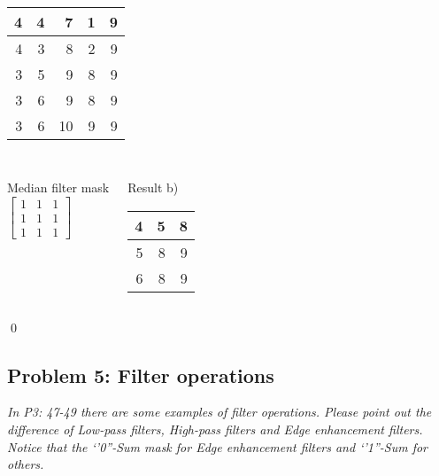 \documentclass[
        ]{beamer}
\begin{document}
\begin{frame}[c]{\subsecname }
\begin{overprint}
\begin{center}
\begin{tabular}{|r|r|r|r|r|}
                    \hline
                    4 & 4 & 7  & 1 & 9 \\\hline
                    4 & 3 & 8  & 2 & 9 \\\hline
                    3 & 5 & 9  & 8 & 9 \\\hline
                    3 & 6 & 9  & 8 & 9 \\\hline
                    3 & 6 & 10 & 9 & 9 \\\hline
            \end{tabular}
            \end{center}
            $\;$\\            
            \begin{columns}
            \begin{center} 
            Median filter mask\\           
            $ \begin{bmatrix} 1 & 1 & 1\\ 1 & 1 & 1\\ 1 & 1 & 1 \end{bmatrix} $
            \end{center}
            \begin{center} 
            Result b)\\           
            \begin{tabular}{|r|r|r|}
                    \hline
                    4 & 5 & 8  \\\hline
                    5 & 8 & 9  \\\hline
                    6 & 8 & 9  \\\hline
            \end{tabular}
            \end{center}
            \end{columns}
            \qed
            \end{overprint}
        \end{frame}  
    \subsection{Problem 5: Filter operations}    
        \begin{frame}[c]{\subsecname}
            \emph{In P3: 47-49 there are some examples of filter operations. Please point out the difference of Low-pass filters, High-pass filters and Edge enhancement filters. Notice that the `'0''-Sum mask for Edge enhancement filters and `'1''-Sum for others. }
        \end{frame}
        
\end{document}
